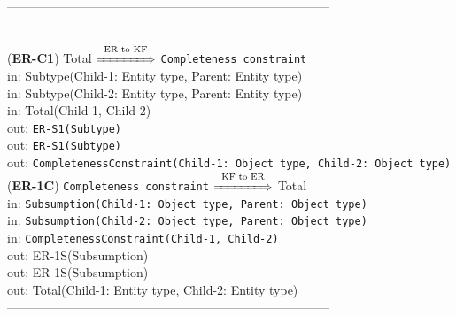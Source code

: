 \documentclass[sn-mathphys]{sn-jnl}
\begin{document}
{{{------------------------------------------------------------------------------
\\ \

({\bf ER-C1}) {Total} $\overset{\text{ER to KF}}{\xLongrightarrow{\hspace*{1.4cm}}}$ {\tt Completeness constraint}\\
\hspace*{0.3cm}in: {Subtype(Child-1: Entity type, Parent: Entity type)} \\
\hspace*{0.3cm}in: {Subtype(Child-2: Entity type, Parent: Entity type)} \\
\hspace*{0.3cm}in: {Total(Child-1, Child-2)} \\
\hspace*{0.5cm}out:  {\tt ER-S1(Subtype)}\\
\hspace*{0.5cm}out:  {\tt ER-S1(Subtype)}\\
\hspace*{0.5cm}out:  {\tt CompletenessConstraint(Child-1: Object type, Child-2: Object type)}\\

({\bf ER-1C}) {\tt Completeness constraint} $\overset{\text{KF to ER}}{\xLongrightarrow{\hspace*{1.4cm}}}$ {Total}\\
\hspace*{0.3cm}in: {\tt Subsumption(Child-1: Object type, Parent: Object type)} \\
\hspace*{0.3cm}in: {\tt Subsumption(Child-2: Object type, Parent: Object type)} \\
\hspace*{0.3cm}in: {\tt CompletenessConstraint(Child-1, Child-2)} \\
\hspace*{0.5cm}out:  {ER-1S(Subsumption)}\\
\hspace*{0.5cm}out:  {ER-1S(Subsumption)}\\
\hspace*{0.5cm}out:  {Total(Child-1: Entity type, Child-2: Entity type)}\\

------------------------------------------------------------------------------
\\ \

}}}
\end{document}
